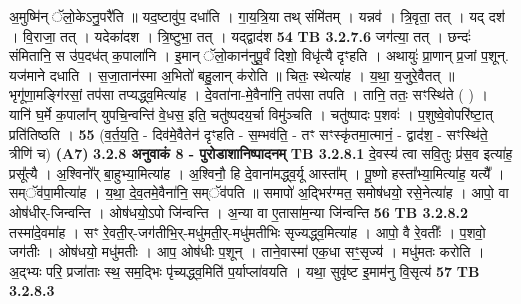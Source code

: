 \documentclass[17pt]{extarticle}
\begin{document}
{{{{{{{{{{{{{{{{{{{                  अ॒मुष्मि॑न् ॅलो॒केऽनु॒परै॑ति ॥ यद॒ष्टावु॑प॒ दधा॑ति । गा॒य॒त्रि॒या तथ् संमि॑तम् । यन्नव॑ । त्रि॒वृता॒ तत् । यद् दश॑ । वि॒राजा॒ तत् । यदेका॑दश । त्रि॒ष्टुभा॒ तत् । यद्द्वाद॑श \textbf{ 54} \newline
                  \newline
                                \textbf{ TB 3.2.7.6} \newline
                  जग॑त्या॒ तत् । छन्दः॑ संमितानि॒ स उ॑प॒दध॑त् क॒पाला॑नि । इ॒मान् ॅलो॒कान॑नुपू॒र्वं दिशो॒ विधृ॑त्यै दृꣳहति । अथायुः॑ प्रा॒णान् प्र॒जां प॒शून्. यज॑माने दधाति । स॒जा॒तान॑स्मा अ॒भितो॑ बहु॒लान् क॑रोति ॥ चितः॒ स्थेत्या॑ह । य॒था॒ य॒जुरे॒वैतत् ॥ भृगू॑णा॒मङ्गि॑रसां॒ तप॑सा तप्यद्ध्व॒मित्या॑ह । दे॒वता॑ना-मे॒वैना॑नि॒ तप॑सा तपति । तानि॒ ततः॒ सꣳस्थि॑ते ( ) । यानि॑ घ॒र्मे क॒पाला᳚न् युपचि॒न्वन्ति॑ वे॒धस॒ इति॒ चतु॑ष्पदय॒र्चा विमु॑ञ्चति । चतु॑ष्पादः प॒शवः॑ । प॒शुष्वे॒वोपरि॑ष्टा॒त् प्रति॑तिष्ठति । \textbf{ 55} \newline
                  \newline
                                    (व॒र्त॒य॒ति॒ - दिव॑मे॒वैतेन॑ दृꣳहति - स॒म्भव॑ति॒ - तꣳ सꣳस्कृ॑तमा॒त्मानं॒ - द्वाद॑श॒ - सꣳस्थि॑ते॒ त्रीणि॑ च) \textbf{(A7)} \newline \newline
                \textbf{ 3.2.8     अनुवाकं   8 - पुरोडाशानिष्पादनम्} \newline
                                \textbf{ TB 3.2.8.1} \newline
                  दे॒वस्य॑ त्वा सवि॒तुः प्र॑स॒व इत्या॑ह॒ प्रसू᳚त्यै । अ॒श्विनो᳚र् बा॒हुभ्या॒मित्या॑ह । अ॒श्विनौ॒ हि दे॒वाना॑मद्ध्व॒र्यू आस्ता᳚म् । पू॒ष्णो हस्ता᳚भ्या॒मित्या॑ह॒ यत्यै᳚ । सम्ॅव॑पा॒मीत्या॑ह । य॒था॒ दे॒व॒तमे॒वैना॑नि॒ सम्ॅव॑पति ॥ समापो॑ अ॒द्भिर॑ग्मत॒ समोष॑धयो॒ रसे॒नेत्या॑ह । आपो॒ वा ओष॑धीर्-जिन्वन्ति । ओष॑धयो॒ऽपो जि॑न्वन्ति । अ॒न्या वा ए॒तासा॑म॒न्या जि॑न्वन्ति \textbf{ 56} \newline
                  \newline
                                \textbf{ TB 3.2.8.2} \newline
                  तस्मा॑दे॒वमा॑ह । सꣳ रे॒वती॒र्-जग॑तीभि॒र्-मधु॑मती॒र्-मधु॑मतीभिः सृज्यद्ध्व॒मित्या॑ह । आपो॒ वै रे॒वतीः᳚ । प॒शवो॒ जग॑तीः । ओष॑धयो॒ मधु॑मतीः । आप॒ ओष॑धीः प॒शून् । ताने॒वास्मा॑ एक॒धा सꣳ॒॒सृज्य॑ । मधु॑मतः करोति । अ॒द्भ्यः परि॒ प्रजा॑ताः स्थ॒ सम॒द्भिः पृ॑च्यद्ध्व॒मिति॑ प॒र्याप्ला॑वयति । यथा॒ सुवृ॑ष्ट इ॒माम॑नु वि॒सृत्य॑ \textbf{ 57} \newline
                  \newline
                                \textbf{ TB 3.2.8.3} \newline
}}}}}}}}}}}}}}}}}}}
\end{document}
